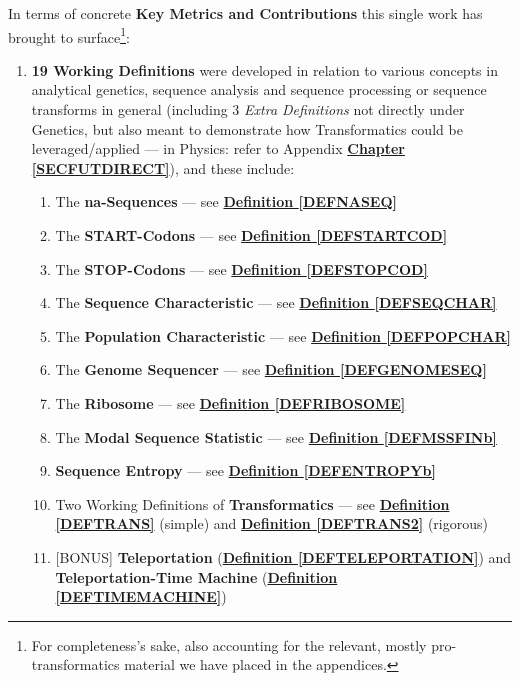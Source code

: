 \documentclass[a4paper, 18pt]{book} %
\begin{document}
In terms of concrete \textbf{Key Metrics and Contributions} this single work has brought to surface\footnote{For completeness's sake, also accounting for the relevant, mostly pro-transformatics material we have placed in the appendices.}:
\begin{enumerate}
\item{ \textbf{19 Working Definitions} were developed in relation to various concepts in analytical genetics, sequence analysis and sequence processing or sequence transforms in general (including 3 \textit{Extra Definitions} not directly under Genetics, but also meant to demonstrate how Transformatics could be leveraged/applied --- in Physics: refer to Appendix  \textbf{\hyperref[SECFUTDIRECT]{Chapter \ref{SECFUTDIRECT}}}), and these include:

	\begin{enumerate}
	\item The \textbf{na-Sequences} --- see  \textbf{\hyperref[DEFNASEQ]{Definition \ref{DEFNASEQ}}}
	\item The \textbf{START-Codons} --- see \textbf{\hyperref[DEFSTARTCOD]{Definition \ref{DEFSTARTCOD}}}
		\item The \textbf{STOP-Codons} --- see \textbf{\hyperref[DEFSTOPCOD]{Definition \ref{DEFSTOPCOD}}}
	\item The \textbf{Sequence Characteristic} --- see  \textbf{\hyperref[DEFSEQCHAR]{Definition \ref{DEFSEQCHAR}}}
	\item The \textbf{Population Characteristic} --- see  \textbf{\hyperref[DEFPOPCHAR]{Definition \ref{DEFPOPCHAR}}}
	\item The \textbf{Genome Sequencer} --- see  \textbf{\hyperref[DEFGENOMESEQ]{Definition \ref{DEFGENOMESEQ}}}
	\item The \textbf{Ribosome} --- see  \textbf{\hyperref[DEFRIBOSOME]{Definition \ref{DEFRIBOSOME}}}
	\item The \textbf{Modal Sequence Statistic} --- see  \textbf{\hyperref[DEFMSSFINb]{Definition \ref{DEFMSSFINb}}}
	\item \textbf{Sequence Entropy} --- see  \textbf{\hyperref[DEFENTROPYb]{Definition \ref{DEFENTROPYb}}}
	\item{ Two Working Definitions of \textbf{Transformatics} --- see  \textbf{\hyperref[DEFTRANS]{Definition \ref{DEFTRANS}}} (simple) and \textbf{\hyperref[DEFTRANS2]{Definition \ref{DEFTRANS2}}} (rigorous)
	}
	\item{ [BONUS] \textbf{Teleportation} (\textbf{\hyperref[DEFTELEPORTATION]{Definition \ref{DEFTELEPORTATION}}}) and \textbf{Teleportation-Time Machine} (\textbf{\hyperref[DEFTIMEMACHINE]{Definition \ref{DEFTIMEMACHINE}}})
	}
	\end{enumerate}

}
\end{enumerate}
\end{document}
